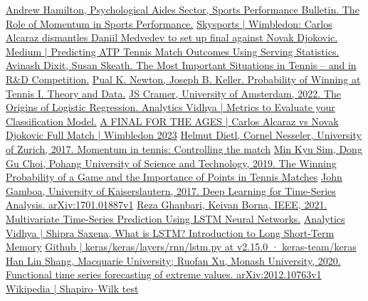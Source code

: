 \documentclass[12pt]{article}  %
\begin{document}

\clearpage   
\begin{thebibliography}{99}
	 \href{https://www.sportsperformancebulletin.com/psychology/psychological-aides/the-role-of-momentum-in-sports-performance}{Andrew Hamilton, Psychological Aides Sector, Sports Performance Bulletin. The Role of Momentum in Sports Performance.}
     \href{https://www.skysports.com/tennis/news/32498/12920986/wimbledon-carlos-alcaraz-dismantles-daniil-medvedev-to-set-up-final-against-novak-djokovic}{Skysports | Wimbledon: Carlos Alcaraz dismantles Daniil Medvedev to set up final against Novak Djokovic.}
	 \href{https://medium.com/swlh/cde03d99f410}{Medium | Predicting ATP Tennis Match Outcomes Using Serving Statistics.}
	 \href{https://www.princeton.edu/~dixitak/home/Tennis.pdf}{Avinash Dixit, Susan Skeath. The Most Important Situations in Tennis – and in R\&D Competition.}
	 \href{https://www.cis.upenn.edu/~bhusnur4/cit592\_fall2013/NeKe2005.pdf}{Pual K. Newton, Joseph B. Keller. Probability of Winning at Tennis I. Theory and Data.}
	 \href{https://papers.tinbergen.nl/02119.pdf}{JS Cramer, University of Amsterdam, 2022. The Origins of Logistic Regression. }
	 \href{https://www.analyticsvidhya.com/blog/2021/07/metrics-to-evaluate-your-classification-model-to-take-the-right-decisions/}{Analytics Vidhya | Metrics to Evaluate your Classification Model.}
	 \href{https://www.youtube.com/watch?v=5uFAkizQNJI}{A FINAL FOR THE AGES | Carlos Alcaraz vs Novak Djokovic Full Match | Wimbledon 2023}
	 \href{https://www.researchgate.net/publication/318275570_Momentum_in_tennis_Controlling_the_match}{Helmut Dietl, Cornel Nesseler, University of Zurich, 2017. Momentum in tennis: Controlling the match}
	 \href{https://www.tandfonline.com/doi/full/10.1080/02701367.2019.1666203}{Min Kyu Sim, Dong Gu Choi, Pohang University of Science and Technology, 2019. The Winning Probability of a Game and the Importance of Points in Tennis Matches}
	 \href{https://arxiv.org/pdf/1701.01887.pdf}{John Gamboa, University of Kaiserslautern, 2017. Deep Learning for Time-Series Analysis. arXiv:1701.01887v1}
	 \href{https://ieeexplore.ieee.org/document/9420543}{Reza Ghanbari, Keivan Borna, IEEE, 2021. Multivariate Time-Series Prediction Using LSTM Neural Networks.}
	 \href{https://www.analyticsvidhya.com/blog/2021/03/introduction-to-long-short-term-memory-lstm/}{Analytics Vidhya | Shipra Saxena, What is LSTM? Introduction to Long Short-Term Memory}
	 \href{https://github.com/keras-team/keras/blob/v2.15.0/keras/layers/rnn/lstm.py#L382-L891}{Github | keras/keras/layers/rnn/lstm.py at v2.15.0 · keras-team/keras}
	 \href{https://arxiv.org/pdf/2012.10763.pdf}{Han Lin Shang, Macquarie University; Ruofan Xu, Monash University, 2020. Functional time series forecasting of extreme values. arXiv:2012.10763v1}
	 \href{https://en.wikipedia.org/wiki/Shapiro%E2%80%93Wilk_test}{Wikipedia | Shapiro–Wilk test}

\end{thebibliography}
\end{document}
